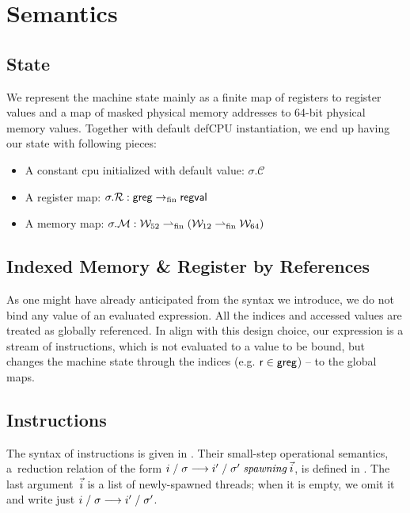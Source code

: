 \section{Semantics}
\label{sec:semantics}
\subsection{State}
\label{sec:state}
We represent the machine state mainly as a finite map of registers to register values and a map of masked physical memory addresses to 64-bit physical memory values. Together with default def\textsf{CPU} instantiation, we end up having our state with following pieces:
\begin{itemize}
\item A constant cpu initialized with default value: $\sigma.\mathcal{C}$
\item A register map: $\sigma.\mathcal{R}: \mathsf{greg} \rightarrow_{\textrm{fin}} \mathsf{regval} $
\item A memory map: $\sigma.\mathcal{M}: \mathcal{W}_{52} \rightharpoonup_{\textrm{fin}} (\mathcal{W}_{12} \rightharpoonup_{\textrm{fin}} \mathcal{W}_{64} )$
\end{itemize}
\subsection{Indexed Memory \& Register by References}
\label{sec:}
As one might have already anticipated from the syntax we introduce, we do not bind any value of an evaluated expression. All the indices and accessed values are treated as globally referenced. In align with this design choice, our expression is a stream of instructions, which is not evaluated to a value to be bound, but changes the machine state through the indices (e.g. $\mathsf{r}\in\mathsf{greg}$) -- to the global maps. 
\subsection{Instructions}
\label{sec:instrsemantics}
The syntax of instructions is given in . Their
small-step operational semantics, a~reduction relation of the form
$i\;/\;\sigma\longrightarrow i'\;/\;\sigma'\mathrel{\textit{spawning}}\vec{i}$,
is defined in .
%
The last argument~$\vec{i}$ is a list of newly-spawned threads;
when it is empty, we omit it
and write just $i\;/\;\sigma\longrightarrow i'\;/\;\sigma'$.
